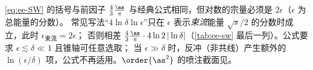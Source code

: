 \begin{remark}[关于常被引用的形式]
\cref{eq:ee-SW} 的括号与前因子 $\frac43\frac{\as}{\pi}$ 与经典公式相同，但对数的宗量必须是 $2\epsilon$（$\epsilon$ 为总能量的分数）。
常见写法“$4\ln\delta\ln\epsilon$”只在 $\epsilon$ 表示\emph{束流}能量 $\sqrt s/2$ 的分数时成立，此时 $\epsilon_{\text{束流}}=2\epsilon$；
否则相差 $\frac43\frac{\as}{\pi}\cdot4\ln2\,|\ln\delta|$（\cref{tab:ee-sw} 最后一列）。公式要求 $\epsilon\lesssim\delta\ll1$ 且锥轴可任意选取；
当 $\epsilon\gg\delta$ 时，反冲（非共线）产生额外的 $\ln(\epsilon/\delta)$ 项，公式不再适用。$\order{\as^2}$ 的喷注截面见\cite{EllisRossTerrano1981,KramerLampe1987}。
\end{remark}
